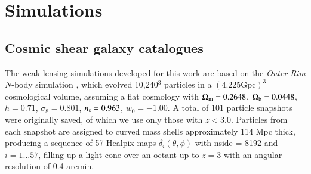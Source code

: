 \section{Simulations}
\label{sec:sims}

\subsection{Cosmic shear galaxy catalogues} 
\label{subsec:WL_cats}

The weak lensing simulations developed for this work are based on  the {\it Outer Rim} $N$-body simulation \citep{OuterRim}, which evolved 10,240$^3$ particles in a $(4.225 \mathrm{Gpc})^3$ cosmological volume, assuming a flat \lcdm cosmology with $\Omega_{\rm m}=0.2648$, $\Omega_{\rm b}=0.0448$, $h=0.71$, $\sigma_8 = 0.801$, $n_{\rm s}= 0.963$, $w_0=-1.00$.
A total of $101$ particle snapshots were originally saved, of which we use only those with $z<3.0$. Particles from each snapshot are assigned to curved mass shells approximately 114 Mpc thick, producing a sequence of 57 {\sc Healpix} maps $\delta_i(\theta, \phi)$ with {\sc nside} = 8192 and $i=1...57$, filling up a light-cone over an octant up to $z = 3$ with an angular resolution of 0.4 arcmin.


